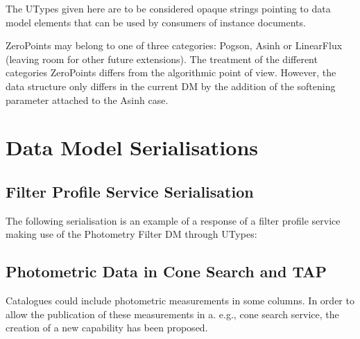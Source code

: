 \documentclass[11pt,a4paper]{ivoa}
\begin{document}
\begin{appendices}

The UTypes given here are to be considered opaque strings pointing to data model
elements that can be used by consumers of instance documents.

ZeroPoints may belong to one of three categories: Pogson, Asinh or LinearFlux
(leaving room for other future extensions). The treatment of the different
categories ZeroPoints differs from the algorithmic point of view.
However, the data structure only differs in the current DM by the addition
of the softening parameter attached to the Asinh case.

\par

\section{Data Model Serialisations} \label{serialisation}
\subsection{Filter Profile Service Serialisation} \label{serialisationfilter}


The following serialisation is an example of a response of a filter profile
service making use of the Photometry Filter DM through UTypes:
\par


\subsection{Photometric Data in Cone Search and TAP}
Catalogues could include photometric measurements in some columns. In order
to allow the publication of these measurements in a. e.g., cone search
service, the creation of a new capability has been proposed.
\par


\end{appendices}
\end{document}
